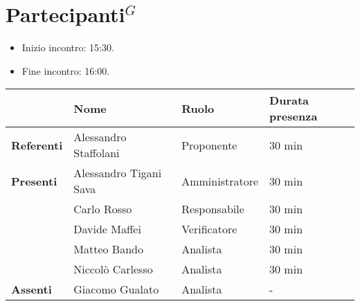 \section*{\gls{Partecipanti}$^G$}

\begin{itemize}
	\item Inizio incontro: 15:30.
	\item Fine incontro: 16:00.
\end{itemize}


\begin{center}
	{\renewcommand{\arraystretch}{1.5}
		\begin{tabular}{l|lll}
			                   & \textbf{Nome}          & \textbf{Ruolo} & \textbf{Durata presenza} \\
			\hline
			\textbf{Referenti} & Alessandro Staffolani  & Proponente     & 30 min                   \\
			\hline
			\textbf{Presenti}  & Alessandro Tigani Sava & Amministratore & 30 min                   \\
			                   & Carlo Rosso            & Responsabile   & 30 min                   \\
			                   & Davide Maffei          & Verificatore   & 30 min                   \\
			                   & Matteo Bando           & Analista       & 30 min                   \\
			                   & Niccolò Carlesso       & Analista       & 30 min                   \\
			\hline
			\textbf{Assenti}   & Giacomo Gualato        & Analista       & -                        \\
		\end{tabular}
	}
\end{center}
